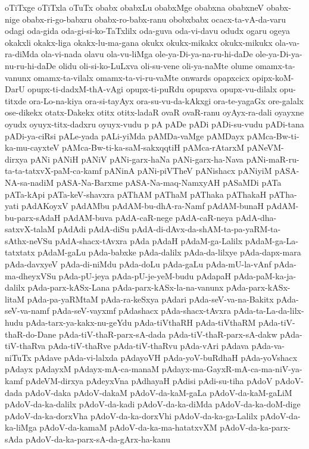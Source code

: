 {oTiTxge
oTiTxla
oTuTx
obabx
obabxLu
obabxMge
obabxna
obabxneV
obabx-nige
obabx-ri-go-babxru
obabx-ro-babx-ranu
obobxbabx
ocacx-ta-vA-da-varu
odagi
oda-gida
oda-gi-si-ko-TaTxlilx
oda-guva
oda-vi-davu
odudx
ogaru
ogeya
okakxli
okakx-liga
okakx-lu-ma-gana
okukx
okukx-mikakx
okukx-mikukx
ola-va-ra-diMda
ola-vi-nada
olavu
ola-vu-liMga
ole-ya-Di-ya-na-ru-hi-daDe
ole-ya-Di-ya-nu-ru-hi-daDe
olidu
oli-si-ko-LuLxva
oli-su-vene
oli-ya-naMte
olume
omamx-ta-vanunx
omamx-ta-vilalx
omamx-ta-vi-ru-vaMte
onwards
opapxcicx
opipx-koM-DarU
opupx-ti-dadxM-thA-vAgi
opupx-ti-puRdu
opupxva
opupx-vu-dilalx
opu-titxde
ora-Lo-na-kiya
ora-si-tayAyx
ora-su-vu-da-kAkxgi
ora-te-yagaGx
ore-galalx
ose-dikekx
otatx-Dakekx
otitx
otitx-ladaR
ovaR
ovaR-ranu
oyAyx-ra-dali
oyayxne
oyudx
oyuyx-titx-dadxru
oyuyx-vudu
p
pA
pADe
pADi
pADi-su-vudu
pADi-tana
pADi-ya-ciRsi
pALe-yada
pALi-yiMda
pAMDa-vaMge
pAMDayx
pAMca-Bw-ti-ka-mu-cayxteV
pAMca-Bw-ti-ka-saM-sakxqqtiH
pAMca-rAtarxM
pANeVM-dirxya
pANi
pANiH
pANiV
pANi-garx-haNa
pANi-garx-ha-Nava
pANi-maR-ru-ta-ta-tatxvX-paM-ca-kamf
pANinA
pANi-piVTheV
pANishacx
pANiyiM
pASA-NA-sa-nadiM
pASA-Na-Barxme
pASA-Na-maq-NamxyAH
pASaMDi
pATa
pATa-kApi
pATa-keV-shavxra
pAThAM
pAThaM
pAThaka
pAThakaH
pATha-yati
pAdAKoyxV
pAdAMbu
pAdAM-bu-dhA-ra-Namf
pAdAM-bunaH
pAdAM-bu-parx-sAdaH
pAdAM-buva
pAdA-caR-nege
pAdA-caR-neya
pAdA-dha-satxvX-talaM
pAdAdi
pAdA-diSu
pAdA-di-dAvx-da-shAM-ta-pa-yaRM-ta-sAthx-neVSu
pAdA-shacx-tAvxra
pAda
pAdaH
pAdaM-ga-Lalilx
pAdaM-ga-La-tatxtatx
pAdaM-gaLu
pAda-babxke
pAda-dalilx
pAda-da-lilxye
pAda-dapx-mara
pAda-davxyeV
pAda-di-niMdu
pAda-doLu
pAda-gaLu
pAda-mU-la-vAnf
pAda-ma-dheyxVSu
pAda-pU-jeya
pAda-pU-je-yeM-budu
pAdapaH
pAda-paM-ka-ja-dalilx
pAda-parx-kASx-Lana
pAda-parx-kASx-la-na-vanunx
pAda-parx-kASx-litaM
pAda-pa-yaRMtaM
pAda-ra-keSxya
pAdari
pAda-seV-va-na-Bakitx
pAda-seV-va-namf
pAda-seV-vayxmf
pAdashacx
pAda-shacx-tAvxra
pAda-ta-La-da-lilx-hudu
pAda-tarx-ya-kakx-nu-geYdu
pAda-tiVthaRH
pAda-tiVthaRM
pAda-tiV-thaR-do-Dane
pAda-tiV-thaR-parx-sA-dada
pAda-tiV-thaR-parx-sA-dakw
pAda-tiV-thaRva
pAda-tiV-thaRve
pAda-tiV-thaRvu
pAda-vAri
pAdava
pAda-va-niTuTx
pAdave
pAda-vi-lalxda
pAdayoVH
pAda-yoV-buRdhaH
pAda-yoVshacx
pAdayx
pAdayxM
pAdayx-mA-ca-manaM
pAdayx-ma-GayxR-mA-ca-ma-niV-ya-kamf
pAdeVM-dirxya
pAdeyxVna
pAdhayaH
pAdisi
pAdi-su-tiha
pAdoV
pAdoV-dada
pAdoV-daka
pAdoV-dakaM
pAdoV-da-kaM-gaLa
pAdoV-da-kaM-gaLiM
pAdoV-da-ka-dalilx
pAdoV-da-kadi
pAdoV-da-ka-diMda
pAdoV-da-ka-doM-dige
pAdoV-da-ka-dorxVha
pAdoV-da-ka-dorxVhi
pAdoV-da-ka-ga-Lalilx
pAdoV-da-ka-liMga
pAdoV-da-kamaM
pAdoV-da-ka-ma-hatatxvXM
pAdoV-da-ka-parx-sAda
pAdoV-da-ka-parx-sA-da-gArx-ha-kanu
}
